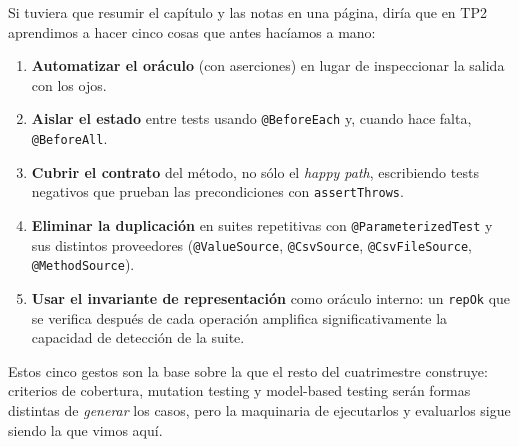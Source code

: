 \documentclass[12pt,a4paper]{article}
\begin{document}
Si tuviera que resumir el capítulo y las notas en una página, diría que en TP2 aprendimos a hacer cinco cosas que antes hacíamos a mano:
\begin{enumerate}
  \item \textbf{Automatizar el oráculo} (con aserciones) en lugar de inspeccionar la salida con los ojos.
  \item \textbf{Aislar el estado} entre tests usando \texttt{@BeforeEach} y, cuando hace falta, \texttt{@BeforeAll}.
  \item \textbf{Cubrir el contrato} del método, no sólo el \textit{happy path}, escribiendo tests negativos que prueban las precondiciones con \texttt{assertThrows}.
  \item \textbf{Eliminar la duplicación} en suites repetitivas con \texttt{@ParameterizedTest} y sus distintos proveedores (\texttt{@ValueSource}, \texttt{@CsvSource}, \texttt{@CsvFileSource}, \texttt{@MethodSource}).
  \item \textbf{Usar el invariante de representación} como oráculo interno: un \texttt{repOk} que se verifica después de cada operación amplifica significativamente la capacidad de detección de la suite.
\end{enumerate}

Estos cinco gestos son la base sobre la que el resto del cuatrimestre construye: criterios de cobertura, mutation testing y model-based testing serán formas distintas de \textit{generar} los casos, pero la maquinaria de ejecutarlos y evaluarlos sigue siendo la que vimos aquí.
\end{document}
